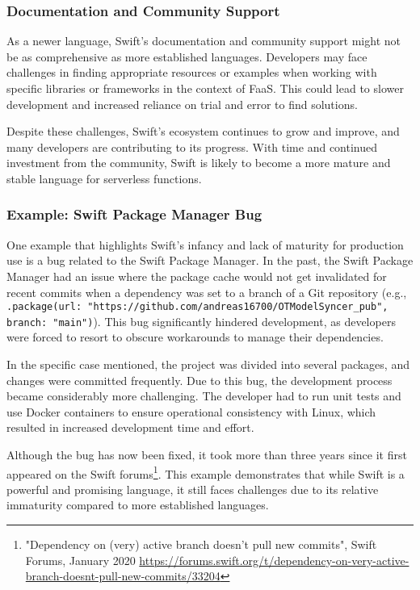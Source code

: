 \subsubsection{Documentation and Community Support}

As a newer language, Swift's documentation and community support might not be as comprehensive as more established languages. Developers may face challenges in finding appropriate resources or examples when working with specific libraries or frameworks in the context of FaaS. This could lead to slower development and increased reliance on trial and error to find solutions.

Despite these challenges, Swift's ecosystem continues to grow and improve, and many developers are contributing to its progress. With time and continued investment from the community, Swift is likely to become a more mature and stable language for serverless functions.

\subsubsection{Example: Swift Package Manager Bug}

One example that highlights Swift's infancy and lack of maturity for production use is a bug related to the Swift Package Manager. In the past, the Swift Package Manager had an issue where the package cache would not get invalidated for recent commits when a dependency was set to a branch of a Git repository (e.g., \texttt{.package(url: "https://github.com/andreas16700/OTModelSyncer_pub", branch: "main")}). This bug significantly hindered development, as developers were forced to resort to obscure workarounds to manage their dependencies.

In the specific case mentioned, the project was divided into several packages, and changes were committed frequently. Due to this bug, the development process became considerably more challenging. The developer had to run unit tests and use Docker containers to ensure operational consistency with Linux, which resulted in increased development time and effort.

Although the bug has now been fixed, it took more than three years since it first appeared on the Swift forums\footnote{"Dependency on (very) active branch doesn’t pull new commits", Swift Forums, January 2020 \url{https://forums.swift.org/t/dependency-on-very-active-branch-doesnt-pull-new-commits/33204}}. This example demonstrates that while Swift is a powerful and promising language, it still faces challenges due to its relative immaturity compared to more established languages.


